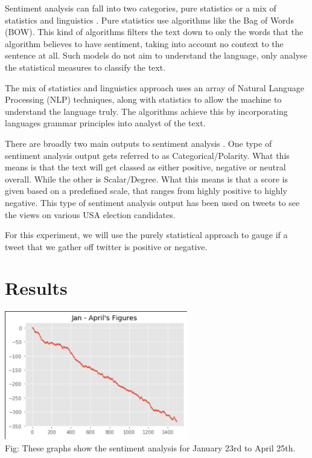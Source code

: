 \documentclass[a4paper,10pt]{article}
\begin{document}
	Sentiment analysis can fall into two categories, pure statistics or a mix of statistics and linguistics \cite{towarddatasciencesentiment}. Pure statistics use algorithms like the Bag of Words (BOW). This kind of algorithms filters the text down to only the words that the algorithm believes to have sentiment, taking into account no context to the sentence at all. Such models do not aim to understand the language, only analyse the statistical measures to classify the text. 
	
	The mix of statistics and linguistics approach uses an array of Natural Language Processing (NLP) techniques, along with statistics to allow the machine to understand the language truly. The algorithms achieve this by incorporating languages grammar principles into analyst of the text. 
	
	There are broadly two main outputs to sentiment analysis \cite{towarddatasciencesentiment}. One type of sentiment analysis output gets referred to as Categorical/Polarity. What this means is that the text will get classed as either positive, negative or neutral overall. While the other is Scalar/Degree. What this means is that a score is given based on a predefined scale, that ranges from highly positive to highly negative. This type of sentiment analysis output has been used on tweets to see the views on various USA election candidates.
	
	For this experiment, we will use the purely statistical approach to gauge if a tweet that we gather off twitter is positive or negative.
	
	
	\section{Results}
	
	
	\begin{center}
		\label{confusion_matrix}
		\includegraphics[width=8cm]{allresults2.png}
		\centering
		\\Fig: These graphs show the sentiment analysis for January 23rd to April 25th. 
	\end{center}
\end{document}
